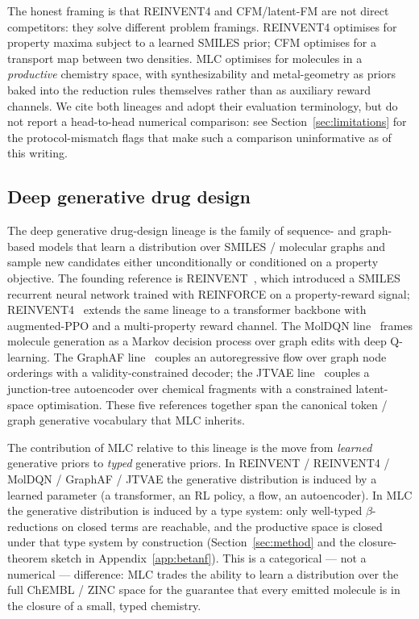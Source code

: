 The honest framing is that REINVENT4 and CFM/latent-FM are not
direct competitors: they solve different problem framings. REINVENT4
optimises for property maxima subject to a learned SMILES prior; CFM
optimises for a transport map between two densities. MLC optimises
for molecules in a \emph{productive} chemistry space, with
synthesizability and metal-geometry as priors baked into the
reduction rules themselves rather than as auxiliary reward channels.
We cite both lineages and adopt their evaluation terminology, but do
not report a head-to-head numerical comparison: see
Section~\ref{sec:limitations} for the protocol-mismatch flags that
make such a comparison uninformative as of this writing.

\subsection{Deep generative drug design}
\label{sec:related:deepgen}

The deep generative drug-design lineage is the family of
sequence- and graph-based models that learn a distribution over
SMILES / molecular graphs and sample new candidates either
unconditionally or conditioned on a property objective. The
founding reference is REINVENT~\cite{footnote:reinvent2017}, which
introduced a SMILES recurrent neural network trained with REINFORCE
on a property-reward signal; REINVENT4~\cite{footnote:reinvent4}
extends the same lineage to a transformer backbone with
augmented-PPO and a multi-property reward channel. The MolDQN
line~\cite{footnote:moldqn} frames molecule generation as a
Markov decision process over graph edits with deep Q-learning. The
GraphAF line~\cite{footnote:graphaf} couples an autoregressive flow
over graph node orderings with a validity-constrained decoder; the
JTVAE line~\cite{footnote:jtvae} couples a junction-tree
autoencoder over chemical fragments with a constrained
latent-space optimisation. These five references together span the
canonical token / graph generative vocabulary that MLC inherits.

The contribution of MLC relative to this lineage is the move from
\emph{learned} generative priors to \emph{typed} generative priors.
In REINVENT / REINVENT4 / MolDQN / GraphAF / JTVAE the generative
distribution is induced by a learned parameter (a transformer, an
RL policy, a flow, an autoencoder). In MLC the generative
distribution is induced by a type system: only well-typed
$\beta$-reductions on closed terms are reachable, and the
productive space is closed under that type system by construction
(Section~\ref{sec:method} and the closure-theorem sketch in
Appendix~\ref{app:betanf}). This is a categorical --- not a
numerical --- difference: MLC trades the ability to learn a
distribution over the full ChEMBL / ZINC space for the guarantee
that every emitted molecule is in the closure of a small, typed
chemistry.

